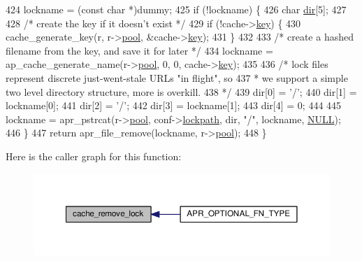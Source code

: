 \begin{DoxyCode}
424     lockname = (\textcolor{keyword}{const} \textcolor{keywordtype}{char} *)dummy;
425     \textcolor{keywordflow}{if} (!lockname) \{
426         \textcolor{keywordtype}{char} \hyperlink{group__APACHE__CORE__DAEMON_ga6d902c83b02c43071b972ed0416729bc}{dir}[5];
427 
428         \textcolor{comment}{/* create the key if it doesn't exist */}
429         \textcolor{keywordflow}{if} (!cache->\hyperlink{structcache__request__rec_a564726b5f7e5dc4fee2fb01d178677b4}{key}) \{
430             cache\_generate\_key(r, r->\hyperlink{structrequest__rec_aa0a0c16f9a9ab3901cdb3f3c9c9d83d0}{pool}, &cache->\hyperlink{structcache__request__rec_a564726b5f7e5dc4fee2fb01d178677b4}{key});
431         \}
432 
433         \textcolor{comment}{/* create a hashed filename from the key, and save it for later */}
434         lockname = ap\_cache\_generate\_name(r->\hyperlink{structrequest__rec_aa0a0c16f9a9ab3901cdb3f3c9c9d83d0}{pool}, 0, 0, cache->\hyperlink{structcache__request__rec_a564726b5f7e5dc4fee2fb01d178677b4}{key});
435 
436         \textcolor{comment}{/* lock files represent discrete just-went-stale URLs "in flight", so}
437 \textcolor{comment}{         * we support a simple two level directory structure, more is overkill.}
438 \textcolor{comment}{         */}
439         dir[0] = \textcolor{charliteral}{'/'};
440         dir[1] = lockname[0];
441         dir[2] = \textcolor{charliteral}{'/'};
442         dir[3] = lockname[1];
443         dir[4] = 0;
444 
445         lockname = apr\_pstrcat(r->\hyperlink{structrequest__rec_aa0a0c16f9a9ab3901cdb3f3c9c9d83d0}{pool}, conf->\hyperlink{structcache__server__conf_ab8f9316567111d3366fcc1edfaf0bc8c}{lockpath}, dir, \textcolor{stringliteral}{"/"}, lockname, 
      \hyperlink{pcre_8txt_ad7f989d16aa8ca809a36bc392c07fba1}{NULL});
446     \}
447     \textcolor{keywordflow}{return} apr\_file\_remove(lockname, r->\hyperlink{structrequest__rec_aa0a0c16f9a9ab3901cdb3f3c9c9d83d0}{pool});
448 \}
\end{DoxyCode}


Here is the caller graph for this function\+:
\nopagebreak
\begin{figure}[H]
\begin{center}
\leavevmode
\includegraphics[width=350pt]{group__Cache__util_ga6936350ce1acc1f19e336eb95be153fb_icgraph}
\end{center}
\end{figure}


